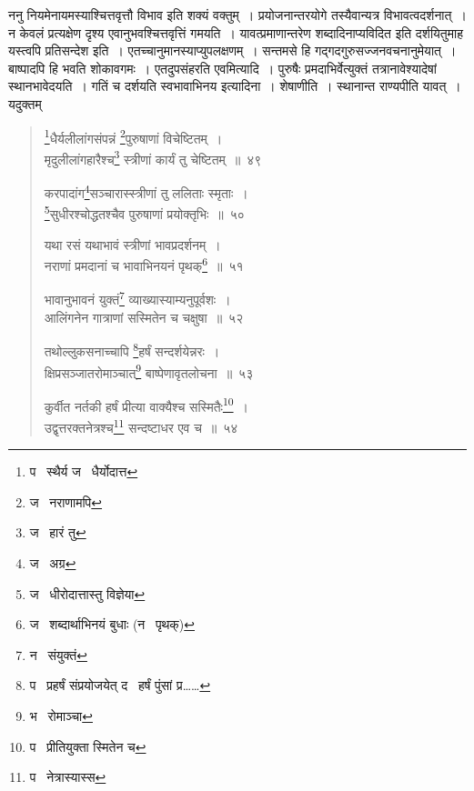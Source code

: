 \documentclass[11pt, openany]{book}
\begin{document}
ननु नियमेनायमस्याश्चित्तवृत्तौ विभाव इति शक्यं वक्तुम्~। प्रयोजनान्तरयोगे तस्यैवान्यत्र विभावत्वदर्शनात्~। न केवलं प्रत्यक्षेण दृश्य एवानुभवश्चित्तवृत्तिं गमयति~। यावत्प्रमाणान्तरेण शब्दादिनाप्यविदित इति दर्शयितुमाह यस्त्वपि प्रतिसन्देश इति~। एतच्चानुमानस्याप्युपलक्षणम्~। सन्तमसे हि गद्गदगुरुसज्जनवचनानुमेयात्~। बाष्पादपि हि भवति शोकावगमः~। एतदुपसंहरति एवमित्यादि~। पुरुषैः प्रमदाभिर्वेत्युक्तं तत्रानावेश्यादेषां स्थानभावेदयति~। गतिं च दर्शयति स्वभावाभिनय इत्यादिना~। शेषाणीति~। स्थानान्त राण्यपीति यावत्~। यदुक्तम्\textendash

\newpage

\begin{quote}
{\na \renewcommand{\thefootnote}{1}\footnote{प \textendash\  स्थैर्य ज \textendash\  धैर्योदात्त}धैर्यलीलांगसंपन्नं \renewcommand{\thefootnote}{2}\footnote{ज \textendash\  नराणामपि}पुरुषाणां विचेष्टितम्~।\\
मृदुलीलांगहारैश्च\renewcommand{\thefootnote}{3}\footnote{ज \textendash\  हारं तु} स्त्रीणां कार्यं तु चेष्टितम्~॥~४९

करपादांग\renewcommand{\thefootnote}{4}\footnote{ज \textendash\  अग्र}सञ्चारास्स्त्रीणां तु ललिताः स्मृताः~।\\
\renewcommand{\thefootnote}{5}\footnote{ज \textendash\  धीरोदात्तास्तु विज्ञेया}सुधीरश्चोद्धतश्चैव पुरुषाणां प्रयोक्तृभिः~॥~५०

यथा रसं यथाभावं स्त्रीणां भावप्रदर्शनम्~।\\
नराणां प्रमदानां च भावाभिनयनं पृथक्\renewcommand{\thefootnote}{6}\footnote{ज \textendash\  शब्दार्थाभिनयं बुधाः (न \textendash\  पृथक्)}~॥~५१

भावानुभावनं युक्तं\renewcommand{\thefootnote}{7}\footnote{न \textendash\  संयुक्तं} व्याख्यास्याम्यनुपूर्वशः~।\\
आलिंगनेन गात्राणां सस्मितेन च चक्षुषा~॥~५२

तथोल्लुकसनाच्चापि \renewcommand{\thefootnote}{8}\footnote{प \textendash\  प्रहर्षं संप्रयोजयेत् द \textendash\  हर्षं पुंसां प्र\ldots \ldots }हर्षं सन्दर्शयेन्नरः~।\\
क्षिप्रसञ्जातरोमाञ्चात्\renewcommand{\thefootnote}{9}\footnote{भ \textendash\  रोमाञ्चा} बाष्पेणावृतलोचना~॥~५३

कुर्वीत नर्तकी हर्षं प्रीत्या वाक्यैश्च सस्मितैः\renewcommand{\thefootnote}{10}\footnote{प \textendash\  प्रीतियुक्ता स्मितेन च}~।\\
उद्वृत्तरक्तनेत्रश्च\renewcommand{\thefootnote}{11}\footnote{प \textendash\  नेत्रास्यास्स} सन्दष्टाधर एव च~॥~५४}
\end{quote}
\end{document}
